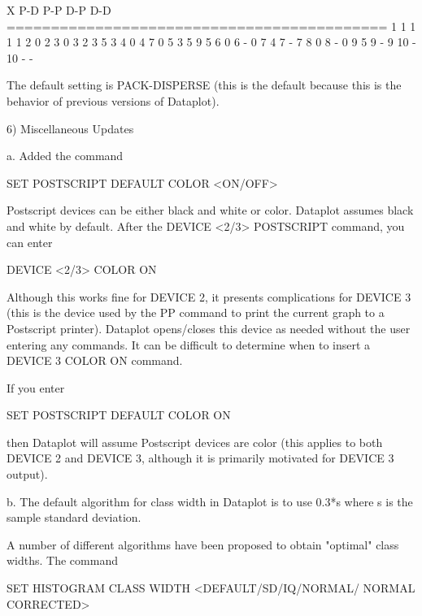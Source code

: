 {           X      P-D       P-P          D-P      D-D
          ===========================================
           1       1         1            1        1
           2       0         2            3        0
           3       2         3            5        3
           4       0         4            7        0
           5       3         5            9        5
           6       0         6            -        0
           7       4         7            -        7
           8       0         8            -        0
           9       5         9            -        9
          10       -        10            -        -

     The default setting is PACK-DISPERSE (this is the default
     because this is the behavior of previous versions of Dataplot).

 6) Miscellaneous Updates

    a. Added the command

         SET POSTSCRIPT DEFAULT COLOR <ON/OFF>

       Postscript devices can be either black and white or color.
       Dataplot assumes black and white by default.  After the
       DEVICE <2/3> POSTSCRIPT command, you can enter

          DEVICE <2/3> COLOR ON

       Although this works fine for DEVICE 2, it presents
       complications for DEVICE 3 (this is the device used by the
       PP command to print the current graph to a Postscript
       printer).  Dataplot opens/closes this device as needed
       without the user entering any commands.  It can be
       difficult to determine when to insert a DEVICE 3 COLOR ON
       command.
 
       If you enter
 
          SET POSTSCRIPT DEFAULT COLOR ON
 
       then Dataplot will assume Postscript devices are color
       (this applies to both DEVICE 2 and DEVICE 3, although it
       is primarily motivated for DEVICE 3 output). 

    b. The default algorithm for class width in Dataplot is to
       use 0.3*s where s is the sample standard deviation.

       A number of different algorithms have been proposed to
       obtain "optimal" class widths.  The command

          SET HISTOGRAM CLASS WIDTH <DEFAULT/SD/IQ/NORMAL/
                                    NORMAL CORRECTED>

}
